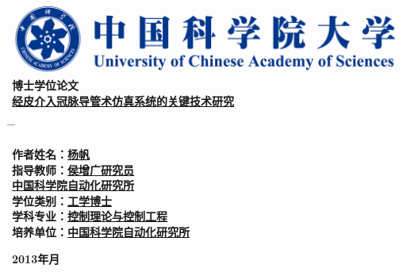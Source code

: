 \vspace*{1.2cm} %
\begin{center}
  \includegraphics[width=13.5cm]{../Figures/UCAS}\\
\vspace{1.7cm} {\yihao \hei \textbf{博士学位论文}}\\
\vspace{2.4cm}
{\xiaoerhao \song \underline{\textbf{经皮介入冠脉导管术仿真系统的关键技术研究}}}\\
\end{center}
\sanhao \vspace{3.1cm}
\begin{tabbing}
\hspace*{-0.8cm} \= \hspace{6.4cm} \= \kill

\>\textbf{作者姓名：\underline{\hspace{4.8cm}杨\;\;\;\;帆\;\;\hspace{6.3cm}}}\\
\>\textbf{指导教师：\underline{\hspace{4.8cm}侯增广\;\;研究员\hspace{4.6cm}}}\\
\>\textbf{\hspace*{2.8cm}\underline{\hspace{3cm}中国科学院自动化研究所 \hspace{4cm}}}\\

\>\textbf{学位类别：\underline{\hspace{4.8cm}工学博士\hspace{6.0cm}}}\\

\>\textbf{学科专业：\underline{\hspace{3.55cm}控制理论与控制工程\hspace{4.5cm}}}\\


\>\textbf{培养单位：\underline{\hspace{3cm}中国科学院自动化研究所 \hspace{4cm}}}\\

\end{tabbing}
\begin{center}
\vspace{1.0cm}
  \textbf{2013\;\;年\;\;\;月}
\end{center}
